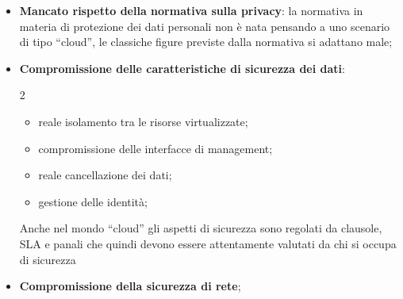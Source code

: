 \begin{critical}[Svantaggi]
    \begin{itemize}
        \item \textbf{Mancato rispetto della normativa sulla privacy}: la normativa in materia di protezione dei dati personali non è nata pensando a uno scenario di tipo ``cloud'', le classiche figure previste dalla normativa si adattano male;
        \item \textbf{Compromissione delle caratteristiche di sicurezza dei dati}:
            \begin{multicols}{2}
                \begin{itemize}
                    \item reale isolamento tra le risorse virtualizzate;
                    \item compromissione delle interfacce di management;
                    \item reale cancellazione dei dati;
                    \item gestione delle identità;
                \end{itemize}
            \end{multicols}
            \begin{note}
                Anche nel mondo ``cloud'' gli aspetti di sicurezza sono regolati da clausole, SLA e panali che quindi devono essere attentamente valutati da chi si occupa di sicurezza
            \end{note}
        \item \textbf{Compromissione della sicurezza di rete};
    \end{itemize}
\end{critical}
%
